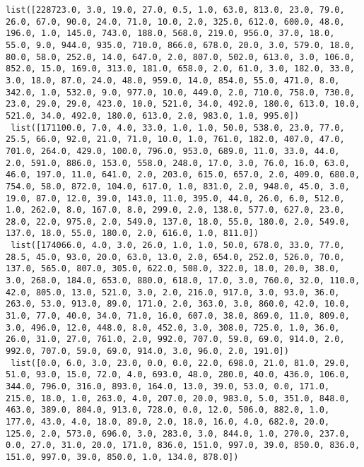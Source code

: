 \documentclass[11pt]{article}
\begin{document}
\begin{Verbatim}[commandchars=\\\{\}]
 list([228723.0, 3.0, 19.0, 27.0, 0.5, 1.0, 63.0, 813.0, 23.0, 79.0, 26.0, 67.0, 90.0, 24.0, 71.0, 10.0, 2.0, 325.0, 612.0, 600.0, 48.0, 196.0, 1.0, 145.0, 743.0, 188.0, 568.0, 219.0, 956.0, 37.0, 18.0, 55.0, 9.0, 944.0, 935.0, 710.0, 866.0, 678.0, 20.0, 3.0, 579.0, 18.0, 80.0, 58.0, 252.0, 14.0, 647.0, 2.0, 807.0, 502.0, 613.0, 3.0, 106.0, 852.0, 15.0, 169.0, 313.0, 181.0, 658.0, 2.0, 61.0, 3.0, 182.0, 33.0, 3.0, 18.0, 87.0, 24.0, 48.0, 959.0, 14.0, 854.0, 55.0, 471.0, 8.0, 342.0, 1.0, 532.0, 9.0, 977.0, 10.0, 449.0, 2.0, 710.0, 758.0, 730.0, 23.0, 29.0, 29.0, 423.0, 10.0, 521.0, 34.0, 492.0, 180.0, 613.0, 10.0, 521.0, 34.0, 492.0, 180.0, 613.0, 2.0, 983.0, 1.0, 995.0])
 list([171100.0, 7.0, 4.0, 33.0, 1.0, 1.0, 50.0, 538.0, 23.0, 77.0, 25.5, 66.0, 92.0, 21.0, 71.0, 10.0, 1.0, 761.0, 182.0, 407.0, 47.0, 701.0, 264.0, 429.0, 100.0, 796.0, 953.0, 689.0, 11.0, 33.0, 44.0, 2.0, 591.0, 886.0, 153.0, 558.0, 248.0, 17.0, 3.0, 76.0, 16.0, 63.0, 46.0, 197.0, 11.0, 641.0, 2.0, 203.0, 615.0, 657.0, 2.0, 409.0, 680.0, 754.0, 58.0, 872.0, 104.0, 617.0, 1.0, 831.0, 2.0, 948.0, 45.0, 3.0, 19.0, 87.0, 12.0, 39.0, 143.0, 11.0, 395.0, 44.0, 26.0, 6.0, 512.0, 1.0, 262.0, 8.0, 167.0, 8.0, 299.0, 2.0, 138.0, 577.0, 627.0, 23.0, 28.0, 22.0, 975.0, 2.0, 549.0, 137.0, 18.0, 55.0, 180.0, 2.0, 549.0, 137.0, 18.0, 55.0, 180.0, 2.0, 616.0, 1.0, 811.0])
 list([174066.0, 4.0, 3.0, 26.0, 1.0, 1.0, 50.0, 678.0, 33.0, 77.0, 28.5, 45.0, 93.0, 20.0, 63.0, 13.0, 2.0, 654.0, 252.0, 526.0, 70.0, 137.0, 565.0, 807.0, 305.0, 622.0, 508.0, 322.0, 18.0, 20.0, 38.0, 3.0, 268.0, 184.0, 653.0, 880.0, 618.0, 17.0, 3.0, 760.0, 32.0, 110.0, 42.0, 805.0, 13.0, 521.0, 3.0, 2.0, 216.0, 917.0, 3.0, 93.0, 36.0, 263.0, 53.0, 913.0, 89.0, 171.0, 2.0, 363.0, 3.0, 860.0, 42.0, 10.0, 31.0, 77.0, 40.0, 34.0, 71.0, 16.0, 607.0, 38.0, 869.0, 11.0, 809.0, 3.0, 496.0, 12.0, 448.0, 8.0, 452.0, 3.0, 308.0, 725.0, 1.0, 36.0, 26.0, 31.0, 27.0, 761.0, 2.0, 992.0, 707.0, 59.0, 69.0, 914.0, 2.0, 992.0, 707.0, 59.0, 69.0, 914.0, 3.0, 96.0, 2.0, 191.0])
 list([0.0, 6.0, 3.0, 23.0, 0.0, 0.0, 22.0, 698.0, 21.0, 81.0, 29.0, 51.0, 93.0, 15.0, 72.0, 4.0, 693.0, 48.0, 280.0, 40.0, 436.0, 106.0, 344.0, 796.0, 316.0, 893.0, 164.0, 13.0, 39.0, 53.0, 0.0, 171.0, 215.0, 18.0, 1.0, 263.0, 4.0, 207.0, 20.0, 983.0, 5.0, 351.0, 848.0, 463.0, 389.0, 804.0, 913.0, 728.0, 0.0, 12.0, 506.0, 882.0, 1.0, 177.0, 43.0, 4.0, 18.0, 89.0, 2.0, 18.0, 16.0, 4.0, 682.0, 20.0, 125.0, 2.0, 573.0, 696.0, 3.0, 283.0, 3.0, 844.0, 1.0, 270.0, 237.0, 0.0, 27.0, 31.0, 20.0, 171.0, 836.0, 151.0, 997.0, 39.0, 850.0, 836.0, 151.0, 997.0, 39.0, 850.0, 1.0, 134.0, 878.0])

\end{Verbatim}
\end{document}
